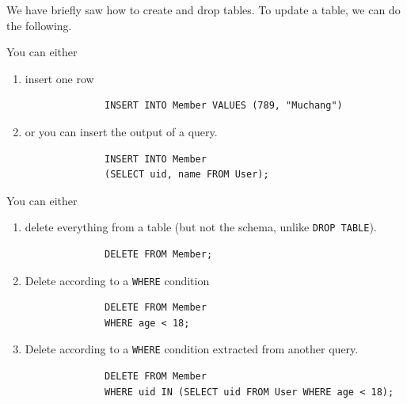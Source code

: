 \documentclass{article}
\begin{document}
      We have briefly saw how to create and drop tables. To update a table, we can do the following. 

      \begin{definition}
        You can either 
        \begin{enumerate}
          \item insert one row  
            \begin{lstlisting}
              INSERT INTO Member VALUES (789, "Muchang")
            \end{lstlisting} 
          \item or you can insert the output of a query. 
            \begin{lstlisting}
              INSERT INTO Member 
              (SELECT uid, name FROM User); 
            \end{lstlisting}
        \end{enumerate}
      \end{definition}

      \begin{definition}
        You can either 
        \begin{enumerate}
          \item delete everything from a table (but not the schema, unlike \texttt{DROP TABLE}). 
            \begin{lstlisting}
              DELETE FROM Member; 
            \end{lstlisting}

          \item Delete according to a \texttt{WHERE} condition 
            \begin{lstlisting}
              DELETE FROM Member 
              WHERE age < 18; 
            \end{lstlisting}

          \item Delete according to a \texttt{WHERE} condition extracted from another query. 
            \begin{lstlisting}
              DELETE FROM Member 
              WHERE uid IN (SELECT uid FROM User WHERE age < 18); 
            \end{lstlisting}
            
        \end{enumerate}
      \end{definition}
\end{document}
